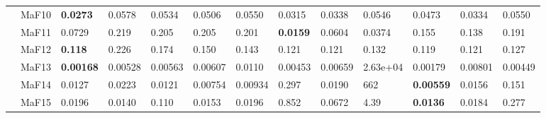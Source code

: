 \documentclass[]{article}
\begin{document}
\begin{landscape}
\begin{table}
\begin{footnotesize}
\begin{tabular}{|l|l|l|l|l|l|l|l|l|l|l|l|l|}
 & MaF10 & \cellcolor{gray95} {\bf 0.0273} & 0.0578 & 0.0534 & 0.0506 & 0.0550 & \cellcolor{gray95} 0.0315 & \cellcolor{gray95} 0.0338 & 0.0546 & 0.0473 & \cellcolor{gray95} 0.0334 & 0.0550\\
 & MaF11 & \cellcolor{gray95} 0.0729 & 0.219 & 0.205 & 0.205 & 0.201 & \cellcolor{gray95} {\bf 0.0159} & \cellcolor{gray95} 0.0604 & \cellcolor{gray95} 0.0374 & 0.155 & 0.138 & 0.191\\
 & MaF12 & \cellcolor{gray95} {\bf 0.118} & 0.226 & 0.174 & 0.150 & 0.143 & \cellcolor{gray95} 0.121 & \cellcolor{gray95} 0.121 & 0.132 & \cellcolor{gray95} 0.119 & \cellcolor{gray95} 0.121 & \cellcolor{gray95} 0.127\\
 & MaF13 & \cellcolor{gray95} {\bf 0.00168} & 0.00528 & 0.00563 & 0.00607 & 0.0110 & 0.00453 & 0.00659 & \cellcolor{gray95} 2.63e+04 & \cellcolor{gray95} 0.00179 & 0.00801 & 0.00449\\
 & MaF14 & 0.0127 & 0.0223 & \cellcolor{gray95} 0.0121 & \cellcolor{gray95} 0.00754 & \cellcolor{gray95} 0.00934 & 0.297 & 0.0190 & 662 & \cellcolor{gray95} {\bf 0.00559} & 0.0156 & 0.151\\
 & MaF15 & 0.0196 & \cellcolor{gray95} 0.0140 & 0.110 & \cellcolor{gray95} 0.0153 & 0.0196 & 0.852 & 0.0672 & 4.39 & \cellcolor{gray95} {\bf 0.0136} & 0.0184 & 0.277\\
\hline
\end{tabular}
\end{footnotesize}
\end{table}
\end{landscape}
\end{document}
